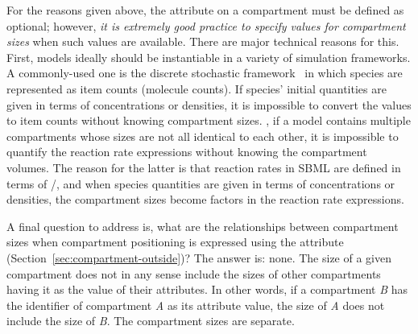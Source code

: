For the reasons given above, the  attribute on a
compartment must be defined as optional; however, \emph{it is
  extremely good practice to specify values for compartment sizes}
when such values are available.  There are  major
technical reasons for this.  First,  models
ideally should be instantiable in a variety of simulation
frameworks.  A commonly-used one is the discrete stochastic
framework~\citep{gillespie:1977,wilkinson_2006} in which species
are represented as item counts (\eg molecule counts).  If species'
initial quantities are given in terms of concentrations or
densities, it is impossible to convert the values to item counts
without knowing compartment sizes.  ,
if a model contains multiple compartments whose sizes are not all
identical to each other, it is impossible to quantify the reaction
rate expressions without knowing the compartment volumes.  The
reason for the latter is  that reaction rates in SBML are defined
in terms of /, and when species quantities are
given in terms of concentrations or densities, the compartment
sizes become factors in the reaction rate expressions.

\begin{blockChanged}

A final question to address is, what are the relationships between
compartment sizes when compartment positioning is expressed using
the  attribute
(Section~\ref{sec:compartment-outside})?  The answer is: none.
The size of a given compartment does not in any sense include the
sizes of other compartments having it as the value of their
 attributes.  In other words, if a compartment
\emph{B} has the identifier of compartment \emph{A} as its
 attribute value, the size of \emph{A} does not
include the size of \emph{B}.  The compartment sizes are separate.

\end{blockChanged}


